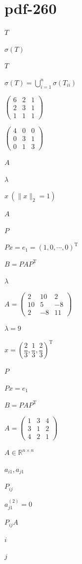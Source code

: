 \documentclass[UTF8,fontset=fandol]{ctexart}
\begin{document}
\section*{pdf-260}
$T$\par
$\sigma(T)$\par
$T$\par
$\sigma(T)=\displaystyle\bigcup_{i=1}^{n}\sigma(T_{ii})$\par
$\begin{pmatrix}6&2&1\\2&3&1\\1&1&1\end{pmatrix}$\par
$\begin{pmatrix}4&0&0\\0&3&1\\0&1&3\end{pmatrix}$\par
$A$\par
$\lambda$\par
$x\ (\|x\|_2=1)$\par
$A$\par
$P$\par
$Px=e_1=(1,0,\cdots,0)^{\mathrm T}$\par
$B=PAP^{\mathrm T}$\par
$\lambda$\par
$A=\begin{pmatrix}2&10&2\\10&5&-8\\2&-8&11\end{pmatrix}$\par
$\lambda=9$\par
$x=\left(\dfrac23,\dfrac13,\dfrac23\right)^{\mathrm T}$\par
$P$\par
$Px=e_1$\par
$B=PAP^{\mathrm T}$\par
$A=\begin{pmatrix}1&3&4\\3&1&2\\4&2&1\end{pmatrix}$\par
$A\in\mathbb R^{n\times n}$\par
$a_{i1},a_{j1}$\par
$P_{ij}$\par
$a_{j1}^{(2)}=0$\par
$P_{ij}A$\par
$i$\par
$j$\par
\end{document}
